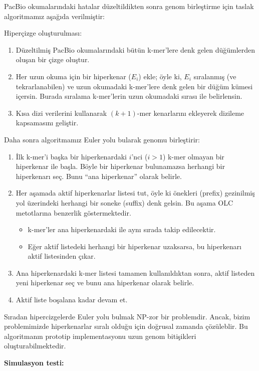 PacBio okumalarındaki hatalar düzeltildikten sonra genom birleştirme için taslak algoritmamız aşağıda verilmiştir:

Hiperçizge oluşturulması:

\begin{enumerate} 
\item Düzeltilmiş PacBio okumalarındaki bütün k-mer'lere denk gelen düğümlerden oluşan bir çizge oluştur.
\item Her uzun okuma için bir hiperkenar ($E_i$) ekle; öyle ki, $E_i$ sıralanmış (ve tekrarlanabilen) ve uzun okumadaki k-mer'lere denk gelen
bir düğüm kümesi içersin. Burada sıralama k-mer'lerin uzun okumadaki sırası ile belirlensin.
\item Kısa dizi verilerini kullanarak $(k+1)$-mer kenarlarını ekleyerek dizileme kapsamasını geliştir.
\end{enumerate}


Daha sonra algoritmamız Euler yolu bularak genomu birleştirir:

\begin{enumerate}
\item İlk k-mer'i başka bir hiperkenardaki $i$'nci ($i>1$) k-mer olmayan bir hiperkenar ile başla. Böyle bir hiperkenar bulunamazsa herhangi bir hiperkenarı seç.
Bunu ``ana hiperkenar'' olarak belirle.
\item Her aşamada aktif hiperkenarlar listesi tut, öyle ki önekleri (prefix) gezinilmiş yol üzerindeki herhangi bir soneke (suffix) denk gelsin. Bu aşama OLC metotlarına
benzerlik göstermektedir.
\begin{itemize}
\item k-mer'ler ana hiperkenardaki ile aynı sırada takip edilecektir.
\item Eğer aktif listedeki herhangi bir hiperkenar uzaksarsa, bu hiperkenarı aktif listesinden çıkar.
\end{itemize}
\item Ana hiperkenardaki k-mer listesi tamamen kullanıldıktan sonra, aktif listeden yeni hiperkenar seç ve bunu ana hiperkenar olarak belirle.
\item Aktif liste boşalana kadar devam et.
\end{enumerate}

Sıradan hipercizgelerde Euler yolu bulmak NP-zor bir problemdir. Ancak, bizim problemimizde hiperkenarlar sıralı olduğu için doğrusal zamanda çözüleblir. Bu algoritmanın prototip implementasyonu uzun genom bitişikleri oluşturabilmektedir.

\clearpage
{\bf Simulasyon testi:}

